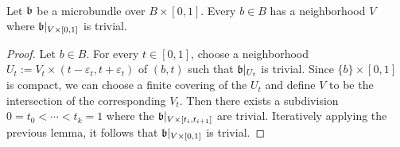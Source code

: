 \lemma{()} \\
Let $\mathfrak{b}$ be a microbundle over $B \times [0, 1]$.
Every $b \in B$ has a neighborhood $V$ where $\mathfrak{b}\vert_{V \times [0, 1]}$ is trivial.
\begin{proof}
Let $b \in B$.
For every $t \in [0, 1]$, choose a neighborhood $U_t := V_t \times (t - \varepsilon_t, t + \varepsilon_t)$ of $(b, t)$ such that $\mathfrak{b}\vert_{U_t}$ is trivial.
Since $\{b\} \times [0, 1]$ is compact, we can choose a finite covering of the $U_t$ and define $V$ to be the intersection of the corresponding $V_t$.
Then there exists a subdivision $0 = t_0 < \cdots < t_k = 1$ where the $\mathfrak{b}\vert_{V \times [t_{i}, t_{i + 1}]}$ are trivial.
Iteratively applying the previous lemma, it follows that $\mathfrak{b}\vert_{V \times [0, 1]}$ is trivial.
\end{proof}